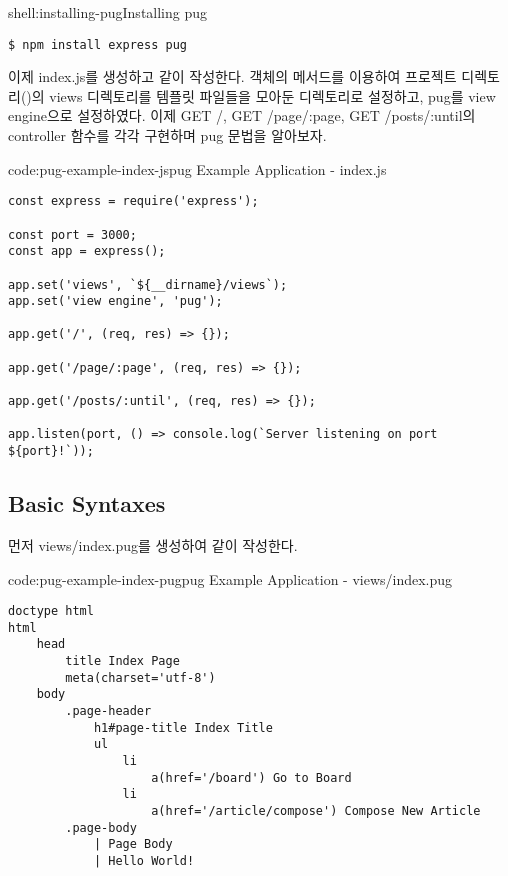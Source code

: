 \begin{shellenv}{shell:installing-pug}{Installing pug}\begin{verbatim}
$ npm install express pug
\end{verbatim}
\end{shellenv}

이제 index.js를 생성하고 \와 같이 작성한다.  객체의  메서드를 이용하여 프로젝트 디렉토리()의 views 디렉토리를 템플릿 파일들을 모아둔 디렉토리로 설정하고, pug를 view engine으로 설정하였다. 이제 GET /, GET /page/:page, GET /posts/:until의 controller 함수를 각각 구현하며 pug 문법을 알아보자.

\begin{codeenv}{code:pug-example-index-js}{pug Example Application - index.js}\begin{verbatim}
const express = require('express');

const port = 3000;
const app = express();

app.set('views', `${__dirname}/views`);
app.set('view engine', 'pug');

app.get('/', (req, res) => {});

app.get('/page/:page', (req, res) => {});

app.get('/posts/:until', (req, res) => {});

app.listen(port, () => console.log(`Server listening on port ${port}!`));
\end{verbatim}
\end{codeenv}

\subsection*{Basic Syntaxes}

먼저 views/index.pug를 생성하여 \와 같이 작성한다.

\begin{codeenv}{code:pug-example-index-pug}{pug Example Application - views/index.pug}\begin{verbatim}
doctype html
html
    head
        title Index Page
        meta(charset='utf-8')
    body
        .page-header
            h1#page-title Index Title
            ul
                li
                    a(href='/board') Go to Board
                li
                    a(href='/article/compose') Compose New Article
        .page-body
            | Page Body
            | Hello World!
\end{verbatim}
\end{codeenv}

